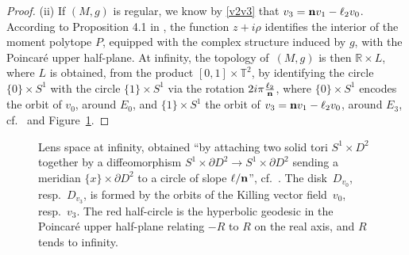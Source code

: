 \documentclass[pdftex]{sigma}
\numberwithin{equation}{section}
\begin{document}
\begin{proof}
(ii) If $(M, g)$ is regular, we know by \eqref{v2v3} that $v _3 = {\bf n} v _1 - \ell _2 v _0$. According to Proposition 4.1 in \cite{BG}, the function $z + i \rho$ identifies the interior of the moment polytope $P$, equipped with the complex structure induced by $g$, with the Poincar\'e upper half-plane. At infinity, the topology of~$(M, g)$ is then $\mathbb{R} \times L$, where $L$ is obtained, from the product $[0, 1] \times \mathbb{T} ^2$, by identifying the circle $\{0\} \times S^1$ with the circle $\{1\} \times S^1$ via the rotation $2 i \pi \frac{\ell _2}{{\bf n}}$, where $\{0\} \times S^1$ encodes the orbit of $v _0$, around $E _0$, and $\{1\} \times S^1$ the orbit of $v _3 = {\bf n} v _1 - \ell _2 v _0$, around $E _3$, cf.\ \cite{hatcher,saveliev} and Figure~\ref{fig:lens}.
\end{proof}

 \begin{figure}[t]\centering
{}
\caption{Lens space at infinity, obtained ``by attaching two solid tori $S^1 \times D^2$ together by a diffeomorphism $S^1 \times \partial D^2 \to S^1 \times \partial D^2$ sending a meridian $\{x\} \times \partial D^2$ to a circle of slope $\ell/{\bf n}$'', cf.\ \cite{hatcher}. The disk~$D _{v _0}$, resp.\ $D _{v_3}$, is formed by the orbits of the Killing vector field~$v_0$, resp.~$v _3$. The red half-circle is the hyperbolic geodesic in the Poincar\'e upper half-plane relating $- R$ to $R$ on the real axis, and $R$ tends to infinity.}
\label{fig:lens}
\end{figure}
\end{document}
